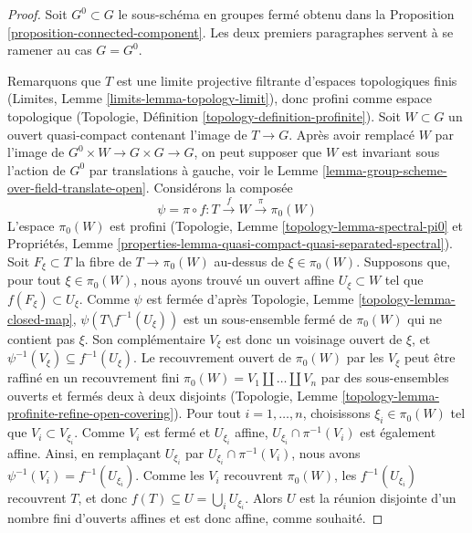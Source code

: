\begin{proof}
Soit $G^0 \subset G$ le sous-schéma en groupes fermé obtenu dans la
Proposition \ref{proposition-connected-component}. Les deux premiers paragraphes
servent à se ramener au cas $G = G^0$.

\medskip\noindent
Remarquons que $T$ est une limite projective filtrante d'espaces topologiques finis
(Limites, Lemme \ref{limits-lemma-topology-limit}), donc profini comme
espace topologique (Topologie, Définition \ref{topology-definition-profinite}).
Soit $W \subset G$ un ouvert quasi-compact contenant l'image de $T \to G$.
Après avoir remplacé $W$ par l'image de $G^0 \times W \to G \times G \to G$, on peut
supposer que $W$ est invariant sous l'action de $G^0$ par translations à gauche, voir
le Lemme \ref{lemma-group-scheme-over-field-translate-open}.
Considérons la composée
$$
\psi = \pi \circ f : T \xrightarrow{f} W \xrightarrow{\pi} \pi_0(W)
$$
L'espace $\pi_0(W)$ est profini
(Topologie, Lemme \ref{topology-lemma-spectral-pi0} et
Propriétés, Lemme
\ref{properties-lemma-quasi-compact-quasi-separated-spectral}).
Soit $F_\xi \subset T$ la fibre de $T \to \pi_0(W)$ au-dessus de $\xi \in \pi_0(W)$.
Supposons que, pour tout $\xi \in \pi_0(W)$, nous ayons trouvé un ouvert affine
$U_\xi \subset W$ tel que $f(F_\xi) \subset U_\xi$. Comme $\psi$ est fermée d'après
Topologie, Lemme \ref{topology-lemma-closed-map},
$\psi(T \setminus f^{-1}(U_\xi))$ est un sous-ensemble fermé de $\pi_0(W)$
qui ne contient pas $\xi$. Son complémentaire $V_\xi$ est donc un
voisinage ouvert de $\xi$, et $\psi^{-1}(V_\xi) \subseteq f^{-1}(U_\xi)$.
Le recouvrement ouvert de $\pi_0(W)$ par les $V_\xi$ peut être raffiné en
un recouvrement fini $\pi_0(W) = V_1 \amalg \ldots \amalg V_n$
par des sous-ensembles ouverts et fermés deux à deux disjoints (Topologie,
Lemme \ref{topology-lemma-profinite-refine-open-covering}).
Pour tout $i = 1, \ldots, n$, choisissons $\xi_i \in \pi_0(W)$
tel que $V_i \subset V_{\xi_i}$. Comme $V_i$ est fermé et
$U_{\xi_i}$ affine, $U_{\xi_i} \cap \pi^{-1}(V_i)$ est également affine.
Ainsi, en remplaçant $U_{\xi_i}$ par $U_{\xi_i} \cap \pi^{-1}(V_i)$, nous
avons $\psi^{-1}(V_i) = f^{-1}(U_{\xi_i})$. Comme les $V_i$ recouvrent
$\pi_0(W)$, les $f^{-1}(U_{\xi_i})$ recouvrent $T$, et donc
$f(T) \subseteq U = \bigcup_i U_{\xi_i}$. Alors $U$ est la réunion disjointe
d'un nombre fini d'ouverts affines et est donc affine, comme souhaité.


\end{proof}

